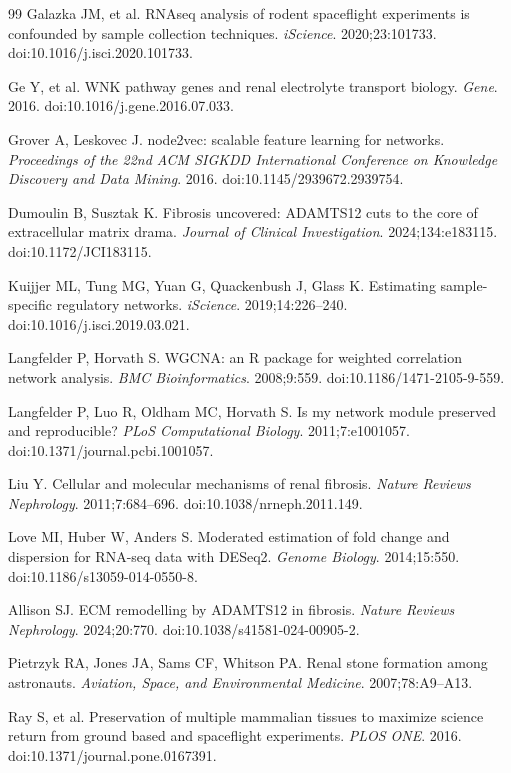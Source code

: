 \documentclass[11pt]{article}
\begin{document}
\begin{thebibliography}{99}
 Galazka JM, et al. RNAseq analysis of rodent spaceflight experiments is confounded by sample collection techniques. \emph{iScience}. 2020;23:101733. doi:10.1016/j.isci.2020.101733.

 Ge Y, et al. WNK pathway genes and renal electrolyte transport biology. \emph{Gene}. 2016. doi:10.1016/j.gene.2016.07.033.

 Grover A, Leskovec J. node2vec: scalable feature learning for networks. \emph{Proceedings of the 22nd ACM SIGKDD International Conference on Knowledge Discovery and Data Mining}. 2016. doi:10.1145/2939672.2939754.

 Dumoulin B, Susztak K. Fibrosis uncovered: ADAMTS12 cuts to the core of extracellular matrix drama. \emph{Journal of Clinical Investigation}. 2024;134:e183115. doi:10.1172/JCI183115.

 Kuijjer ML, Tung MG, Yuan G, Quackenbush J, Glass K. Estimating sample-specific regulatory networks. \emph{iScience}. 2019;14:226--240. doi:10.1016/j.isci.2019.03.021.

 Langfelder P, Horvath S. WGCNA: an R package for weighted correlation network analysis. \emph{BMC Bioinformatics}. 2008;9:559. doi:10.1186/1471-2105-9-559.

 Langfelder P, Luo R, Oldham MC, Horvath S. Is my network module preserved and reproducible? \emph{PLoS Computational Biology}. 2011;7:e1001057. doi:10.1371/journal.pcbi.1001057.

 Liu Y. Cellular and molecular mechanisms of renal fibrosis. \emph{Nature Reviews Nephrology}. 2011;7:684--696. doi:10.1038/nrneph.2011.149.

 Love MI, Huber W, Anders S. Moderated estimation of fold change and dispersion for RNA-seq data with DESeq2. \emph{Genome Biology}. 2014;15:550. doi:10.1186/s13059-014-0550-8.

 Allison SJ. ECM remodelling by ADAMTS12 in fibrosis. \emph{Nature Reviews Nephrology}. 2024;20:770. doi:10.1038/s41581-024-00905-2.

 Pietrzyk RA, Jones JA, Sams CF, Whitson PA. Renal stone formation among astronauts. \emph{Aviation, Space, and Environmental Medicine}. 2007;78:A9--A13.

 Ray S, et al. Preservation of multiple mammalian tissues to maximize science return from ground based and spaceflight experiments. \emph{PLOS ONE}. 2016. doi:10.1371/journal.pone.0167391.


\end{thebibliography}
\end{document}
